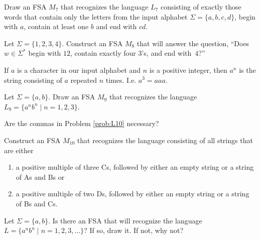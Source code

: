 \begin{prb}\label{prob:L7}
Draw an FSA $M_7$ that recognizes the language $L_7$ consisting of exactly those words that contain only the letters from the input alphabet $\Sigma = \{a,b,c,d\}$, begin with $a$, contain at least one $b$ and end with $cd$.
\end{prb}

\begin{prb}\label{prob:L8}
Let $\Sigma = \{1,2,3,4\}$.  Construct an FSA $M_8$ that will answer the question, ``Does $w \in \Sigma^*$ begin with $12$, contain exactly four $3$'s, and end with~$4$?''
\end{prb}

\begin{dfn}
If $a$ is a character in our input alphabet and $n$ is a positive integer, then $a^n$ is the string consisting of $a$ repeated $n$ times. I.e. $a^3=aaa.$
\end{dfn}

\begin{prb}
Let $\Sigma = \{a,b\}.$  Draw an FSA $M_{9}$ that recognizes the language $L_{9} = \{a^nb^n \mid n = 1, 2, 3 \}$.
\end{prb}

\begin{prb}
Are the commas in Problem \ref{prob:L10} necessary?
\begin{annotation}
\end{annotation}
\end{prb}

\begin{prb}\label{prob:L10}
Construct an FSA $M_{10}$ that recognizes the language consisting of all strings that are either
\begin{enumerate}
\item a positive multiple of three Cs, followed by either an empty string or a string of As and Bs or
\item a positive multiple of two Ds, followed by either an empty string or a string of Bs and Cs.
\end{enumerate}
\end{prb}

\begin{prb}\label{L_=}
Let $\Sigma = \{a,b\}$.  Is there an FSA that will recognize the language $L = \{a^nb^n \mid n = 1,2,3,\dots\}$?  If so, draw it.  If not, why not?
\end{prb}



